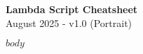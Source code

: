 \documentclass[10pt,a4paper]{article}
\begin{document}
\begin{center}
{\Large \textbf{Lambda Script Cheatsheet}} \\
{\small August 2025 - v1.0 (Portrait)}
\end{center}

\vspace{3pt}

\begin{multicols}{3}

$body$

\end{multicols}
\end{document}
